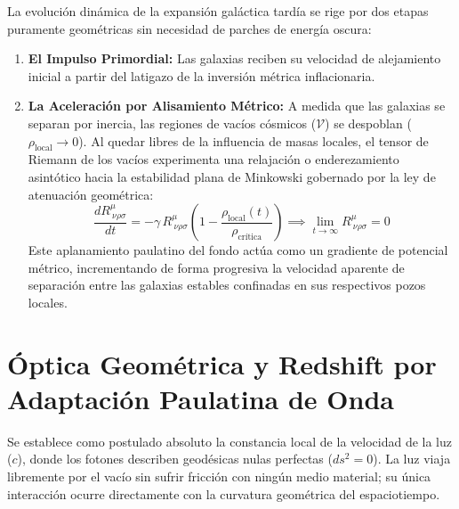 \documentclass[11pt,a4paper]{article}
\begin{document}
La evolución dinámica de la expansión galáctica tardía se rige por dos etapas puramente geométricas sin necesidad de parches de energía oscura:
\begin{enumerate}
    \item \textbf{El Impulso Primordial:} Las galaxias reciben su velocidad de alejamiento inicial a partir del latigazo de la inversión métrica inflacionaria.
    \item \textbf{La Aceleración por Alisamiento Métrico:} A medida que las galaxias se separan por inercia, las regiones de vacíos cósmicos ($\mathcal{V}$) se despoblan ($\rho_{\text{local}} \to 0$). Al quedar libres de la influencia de masas locales, el tensor de Riemann de los vacíos experimenta una relajación o enderezamiento asintótico hacia la estabilidad plana de Minkowski gobernado por la ley de atenuación geométrica:
    \begin{equation}
    \frac{d R^{\mu}_{\ \nu\rho\sigma}}{dt} = -\gamma \, R^{\mu}_{\ \nu\rho\sigma} \left( 1 - \frac{\rho_{\text{local}}(t)}{\rho_{\text{crítica}}} \right) \implies \lim_{t \to \infty} R^{\mu}_{\ \nu\rho\sigma} = 0
    \end{equation}
    Este aplanamiento paulatino del fondo actúa como un gradiente de potencial métrico, incrementando de forma progresiva la velocidad aparente de separación entre las galaxias estables confinadas en sus respectivos pozos locales.
\end{enumerate}

\section{Óptica Geométrica y Redshift por Adaptación Paulatina de Onda}
Se establece como postulado absoluto la constancia local de la velocidad de la luz ($c$), donde los fotones describen geodésicas nulas perfectas ($ds^2 = 0$). La luz viaja libremente por el vacío sin sufrir fricción con ningún medio material; su única interacción ocurre directamente con la curvatura geométrica del espaciotiempo.
\end{document}
